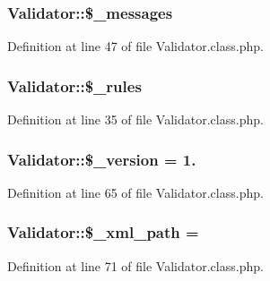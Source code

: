 \subsubsection[{\$\+\_\+messages}]{\setlength{\rightskip}{0pt plus 5cm}Validator\+::\$\+\_\+messages}\label{classValidator_ac9f1f384dc723b2a4581e83066fba49c}


Definition at line 47 of file Validator.\+class.\+php.

\hypertarget{classValidator_ab0ec00f502a96e6c95d963fe8cf40c00}{}
\subsubsection[{\$\+\_\+rules}]{\setlength{\rightskip}{0pt plus 5cm}Validator\+::\$\+\_\+rules}\label{classValidator_ab0ec00f502a96e6c95d963fe8cf40c00}


Definition at line 35 of file Validator.\+class.\+php.

\hypertarget{classValidator_af3e80f6437543d50f58f1e5269900068}{}
\subsubsection[{\$\+\_\+version}]{\setlength{\rightskip}{0pt plus 5cm}Validator\+::\$\+\_\+version = \textquotesingle{}1.\textquotesingle{}}\label{classValidator_af3e80f6437543d50f58f1e5269900068}


Definition at line 65 of file Validator.\+class.\+php.

\hypertarget{classValidator_a69a5bdd50a59f7d9daab2ea702036277}{}
\subsubsection[{\$\+\_\+xml\+\_\+path}]{\setlength{\rightskip}{0pt plus 5cm}Validator\+::\$\+\_\+xml\+\_\+path = \textquotesingle{}\textquotesingle{}}\label{classValidator_a69a5bdd50a59f7d9daab2ea702036277}


Definition at line 71 of file Validator.\+class.\+php.

\hypertarget{classValidator_a45a0aaa905493683be7fc01a80837a26}{}
